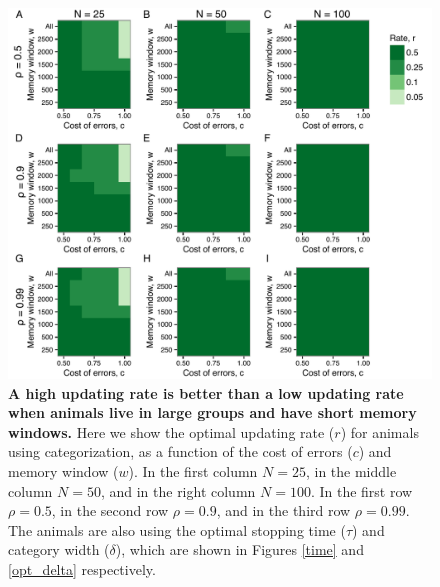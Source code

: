 \begin{figure}
\includegraphics[width=6.85in]{figures/l_heat_maps.pdf}
\caption{\sffamily\small\textbf{A high updating rate is better than a low updating rate when animals live in large groups and have short memory windows.} Here we show the optimal updating rate ($r$) for animals using categorization, as a function of the cost of errors ($c$) and memory window ($w$). In the first column $N=25$, in the middle column $N=50$, and in the right column $N=100$. In the first row $\rho=0.5$, in the second row $\rho=0.9$, and in the third row $\rho=0.99$. The animals are also using the optimal stopping time ($\tau$) and category width ($\delta$), which are shown in Figures \ref{time} and \ref{opt_delta} respectively.}
\label{l}
\end{figure} 



